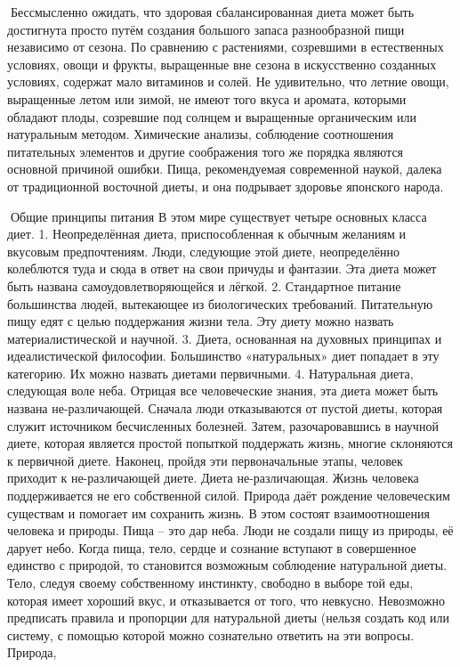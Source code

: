 \documentclass[a4paper]{book}
\begin{document}
Бессмысленно ожидать, что здоровая сбалансированная диета может быть достигнута
просто путём создания большого запаса разнообразной пищи независимо от сезона. По
сравнению с растениями, созревшими в естественных условиях, овощи и фрукты,
выращенные вне сезона в искусственно созданных условиях, содержат мало витаминов и
солей. Не удивительно, что летние овощи, выращенные летом или зимой, не имеют того
вкуса и аромата, которыми обладают плоды, созревшие под солнцем и выращенные
органическим или натуральным методом.
Химические анализы, соблюдение соотношения питательных элементов и другие
соображения того же порядка являются основной причиной ошибки. Пища, рекомендуемая
современной наукой, далека от традиционной восточной диеты, и она подрывает здоровье
японского народа.

Общие принципы питания
В этом мире существует четыре основных класса диет.
1. Неопределённая диета, приспособленная к обычным желаниям и вкусовым
предпочтениям. Люди, следующие этой диете, неопределённо колеблются туда и сюда в
ответ на свои причуды и фантазии. Эта диета может быть названа самоудовлетворяющейся и
лёгкой.
2. Стандартное питание большинства людей, вытекающее из биологических
требований. Питательную пищу едят с целью поддержания жизни тела. Эту диету можно
назвать материалистической и научной.
3. Диета, основанная на духовных принципах и идеалистической философии.
Большинство «натуральных» диет попадает в эту категорию. Их можно назвать диетами
первичными.
4. Натуральная диета, следующая воле неба. Отрицая все человеческие знания, эта диета
может быть названа не-различающей.
Сначала люди отказываются от пустой диеты, которая служит источником
бесчисленных болезней. Затем, разочаровавшись в научной диете, которая является простой
попыткой поддержать жизнь, многие склоняются к первичной диете. Наконец, пройдя эти
первоначальные этапы, человек приходит к не-различающей диете.
Диета не-различающая. Жизнь человека поддерживается не его собственной силой.
Природа даёт рождение человеческим существам и помогает им сохранить жизнь. В этом
состоят взаимоотношения человека и природы. Пища – это дар неба. Люди не создали пищу
из природы, её дарует небо.
Когда пища, тело, сердце и сознание вступают в совершенное единство с природой, то
становится возможным соблюдение натуральной диеты. Тело, следуя своему собственному
инстинкту, свободно в выборе той еды, которая имеет хороший вкус, и отказывается от того,
что невкусно.
Невозможно предписать правила и пропорции для натуральной диеты (нельзя создать
код или систему, с помощью которой можно сознательно ответить на эти вопросы. Природа,
\end{document}
